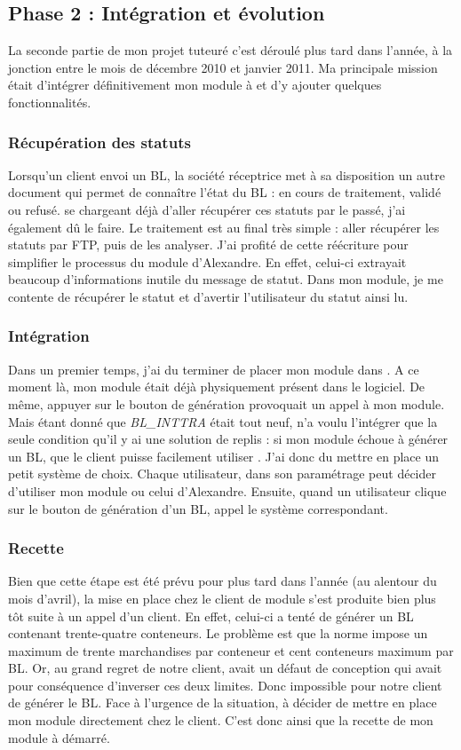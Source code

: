 \subsection{Phase 2 : Intégration et évolution}
La seconde partie de mon projet tuteuré c'est déroulé plus tard dans l'année, à la jonction entre le mois de décembre 2010 et janvier 2011. Ma principale mission était d'intégrer définitivement mon module à \integrale{} et d'y ajouter quelques fonctionnalités.

\subsubsection{Récupération des statuts}
Lorsqu'un client envoi un BL, la société réceptrice met à sa disposition un autre document qui permet de connaître l'état du BL : en cours de traitement, validé ou refusé. \pireus{} se chargeant déjà d'aller récupérer ces statuts par le passé, j'ai également dû le faire. Le traitement est au final très simple : aller récupérer les statuts par FTP, puis de les analyser. J'ai profité de cette réécriture pour simplifier le processus du module d'Alexandre. En effet, celui-ci extrayait beaucoup d'informations inutile du message de statut. Dans mon module, je me contente de récupérer le statut et d'avertir l'utilisateur du statut ainsi lu.

\subsubsection{Intégration}
Dans un premier temps, j'ai du terminer de placer mon module dans \integrale. A ce moment là, mon module était déjà physiquement présent dans le logiciel. De même, appuyer sur le bouton de génération provoquait un appel à mon module. Mais étant donné que \emph{BL\_INTTRA} était tout neuf, \solulog{} n'a voulu l'intégrer que la seule condition qu'il y ai une solution de replis : si mon module échoue à générer un BL, que le client puisse facilement utiliser \pireus. J'ai donc du mettre en place un petit système de choix. Chaque utilisateur, dans son paramétrage peut décider d'utiliser mon module ou celui d'Alexandre. Ensuite, quand un utilisateur clique sur le bouton de génération d'un BL, \integrale{} appel le système correspondant.

\subsubsection{Recette}
Bien que cette étape est été prévu pour plus tard dans l'année (au alentour du mois d'avril), la mise en place chez le client de module s'est produite bien plus tôt suite à un appel d'un client. En effet, celui-ci a tenté de générer un BL contenant trente-quatre conteneurs. Le problème est que la norme impose un maximum de trente marchandises par conteneur et cent conteneurs maximum par BL. Or, au grand regret de notre client, \pireus{} avait un défaut de conception qui avait pour conséquence d'inverser ces deux limites. Donc impossible pour notre client de générer le BL. Face à l'urgence de la situation, \solulog{} à décider de mettre en place mon module directement chez le client. C'est donc ainsi que la recette de mon module à démarré.

